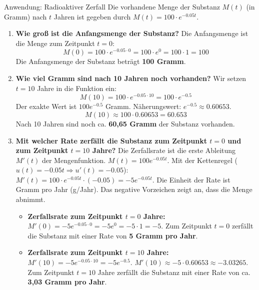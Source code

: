 \begin{loesungsumgebung}{Anwendung: Radioaktiver Zerfall}
Die vorhandene Menge der Substanz $M(t)$ (in Gramm) nach $t$ Jahren ist gegeben durch $M(t) = 100 \cdot e^{-0.05t}$.

\begin{enumerate}[label=(\alph*)]
    \item \textbf{Wie groß ist die Anfangsmenge der Substanz?}
    Die Anfangsmenge ist die Menge zum Zeitpunkt $t=0$:
    $$ M(0) = 100 \cdot e^{-0.05 \cdot 0} = 100 \cdot e^0 = 100 \cdot 1 = 100 $$
    Die Anfangsmenge der Substanz beträgt \textbf{100 Gramm}.

    \item \textbf{Wie viel Gramm sind nach 10 Jahren noch vorhanden?}
    Wir setzen $t=10$ Jahre in die Funktion ein:
    $$ M(10) = 100 \cdot e^{-0.05 \cdot 10} = 100 \cdot e^{-0.5} $$
    Der exakte Wert ist $100e^{-0.5}$ Gramm.
    Näherungswert: $e^{-0.5} \approx 0.60653$.
    $$ M(10) \approx 100 \cdot 0.60653 = 60.653 $$
    Nach 10 Jahren sind noch ca. \textbf{60,65 Gramm} der Substanz vorhanden.

    \item \textbf{Mit welcher Rate zerfällt die Substanz zum Zeitpunkt $t=0$ und zum Zeitpunkt $t=10$ Jahre?}
    Die Zerfallsrate ist die erste Ableitung $M'(t)$ der Mengenfunktion.
    $M(t) = 100 e^{-0.05t}$.
    Mit der Kettenregel ($u(t)=-0.05t \Rightarrow u'(t)=-0.05$):
    $M'(t) = 100 \cdot e^{-0.05t} \cdot (-0.05) = -5e^{-0.05t}$.
    Die Einheit der Rate ist Gramm pro Jahr (g/Jahr). Das negative Vorzeichen zeigt an, dass die Menge abnimmt.

    \begin{itemize}
        \item \textbf{Zerfallsrate zum Zeitpunkt $t=0$ Jahre:}
        $M'(0) = -5e^{-0.05 \cdot 0} = -5e^0 = -5 \cdot 1 = -5$.
        Zum Zeitpunkt $t=0$ zerfällt die Substanz mit einer Rate von \textbf{5 Gramm pro Jahr}.
        \item \textbf{Zerfallsrate zum Zeitpunkt $t=10$ Jahre:}
        $M'(10) = -5e^{-0.05 \cdot 10} = -5e^{-0.5}$.
        $M'(10) \approx -5 \cdot 0.60653 \approx -3.03265$.
        Zum Zeitpunkt $t=10$ Jahre zerfällt die Substanz mit einer Rate von ca. \textbf{3,03 Gramm pro Jahr}.
    \end{itemize}


\end{enumerate}
\end{loesungsumgebung}
